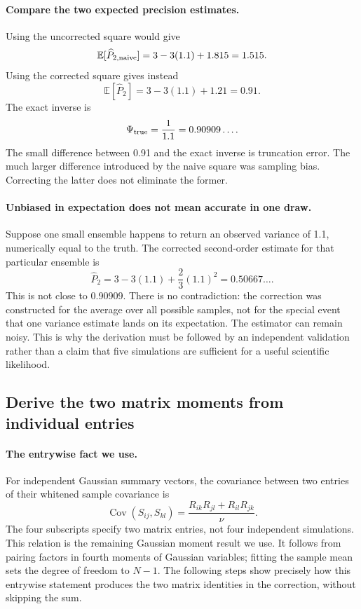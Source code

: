 \documentclass[11pt]{article}
\newcommand{\E}{\mathbb{E}}
\newcommand{\cov}{\operatorname{Cov}}
\begin{document}
\paragraph{Compare the two expected precision estimates.}
Using the uncorrected square would give
\begin{equation}
 \E[\widehat P_{2,\rm naive}]=3-3(1.1)+1.815=1.515.
\end{equation}
Using the corrected square gives instead
\begin{equation}
 \E[\widehat P_2]=3-3(1.1)+1.21=0.91.
\end{equation}
The exact inverse is
\begin{equation}
 \Psi_{\rm true}=\frac1{1.1}=0.90909\ldots.
\end{equation}
The small difference between 0.91 and the exact inverse is truncation
error. The much larger difference introduced by the naive square was
sampling bias. Correcting the latter does not eliminate the former.

\paragraph{Unbiased in expectation does not mean accurate in one draw.}
Suppose one small ensemble happens to return an observed variance of
1.1, numerically equal to the truth. The corrected second-order estimate
for that particular ensemble is
\begin{equation}
 \widehat P_2=3-3(1.1)+\frac23(1.1)^2=0.50667\ldots.
\end{equation}
This is not close to 0.90909. There is no contradiction: the correction
was constructed for the average over all possible samples, not for the
special event that one variance estimate lands on its expectation. The
estimator can remain noisy. This is why the derivation must be followed by
an independent validation rather than a claim that five simulations are
sufficient for a useful scientific likelihood.

\subsection{Derive the two matrix moments from individual entries}
\label{sec:entry-derivation}
\paragraph{The entrywise fact we use.}
For independent Gaussian summary vectors, the covariance between two
entries of their whitened sample covariance is
\begin{equation}
 \cov(S_{ij},S_{kl})=
       \frac{R_{ik}R_{jl}+R_{il}R_{jk}}{\nu}.
 \label{eq:wishart-entry}
\end{equation}
The four subscripts specify two matrix entries, not four independent
simulations. This relation is the remaining Gaussian moment result we
use. It follows from pairing factors in fourth moments of Gaussian
variables; fitting the sample mean sets the degree of freedom to $N-1$.
The following steps show precisely how this entrywise statement produces
the two matrix identities in the correction, without skipping the sum.
\end{document}

